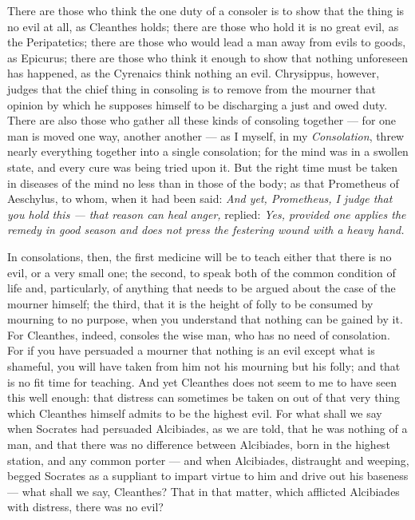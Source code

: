  There are those who think the one duty of a consoler is to show that the thing is no evil at all, as Cleanthes holds; there are those who hold it is no great evil, as the Peripatetics; there are those who would lead a man away from evils to goods, as Epicurus; there are those who think it enough to show that nothing unforeseen has happened, as the Cyrenaics think nothing an evil. Chrysippus, however, judges that the chief thing in consoling is to remove from the mourner that opinion by which he supposes himself to be discharging a just and owed duty. There are also those who gather all these kinds of consoling together — for one man is moved one way, another another — as I myself, in my \textit{Consolation}, threw nearly everything together into a single consolation; for the mind was in a swollen state, and every cure was being tried upon it. But the right time must be taken in diseases of the mind no less than in those of the body; as that Prometheus of Aeschylus, to whom, when it had been said: \textit{And yet, Prometheus, I judge that you hold this — that reason can heal anger,} replied: \textit{Yes, provided one applies the remedy in good season and does not press the festering wound with a heavy hand.}

 In consolations, then, the first medicine will be to teach either that there is no evil, or a very small one; the second, to speak both of the common condition of life and, particularly, of anything that needs to be argued about the case of the mourner himself; the third, that it is the height of folly to be consumed by mourning to no purpose, when you understand that nothing can be gained by it. For Cleanthes, indeed, consoles the wise man, who has no need of consolation. For if you have persuaded a mourner that nothing is an evil except what is shameful, you will have taken from him not his mourning but his folly; and that is no fit time for teaching. And yet Cleanthes does not seem to me to have seen this well enough: that distress can sometimes be taken on out of that very thing which Cleanthes himself admits to be the highest evil. For what shall we say when Socrates had persuaded Alcibiades, as we are told, that he was nothing of a man, and that there was no difference between Alcibiades, born in the highest station, and any common porter — and when Alcibiades, distraught and weeping, begged Socrates as a suppliant to impart virtue to him and drive out his baseness — what shall we say, Cleanthes? That in that matter, which afflicted Alcibiades with distress, there was no evil?

